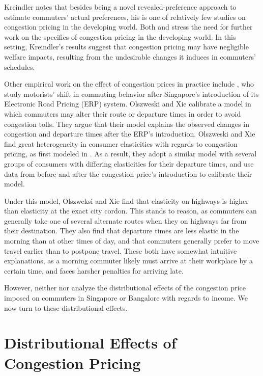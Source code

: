 \documentclass[JEL]{AEA}
\begin{document}
Kreindler notes that besides being a novel revealed-preference approach to estimate commuters' actual preferences, his is one of relatively few studies on congestion pricing in the developing world. Both \cite{kreindler-2018} and \cite{bryan-2020} stress the need for further work on the specifics of congestion pricing in the developing world. In this setting, Kreindler's results suggest that congestion pricing may have negligible welfare impacts, resulting from the undesirable changes it induces in commuters' schedules.

Other empirical work on the effect of congestion prices in practice include \cite{olszweski-2005}, who study motorists' shift in commuting behavior after Singapore's introduction of its Electronic Road Pricing (ERP) system. Olszweski and Xie calibrate a model in which commuters may alter their route or departure times in order to avoid congestion tolls. They argue that their model explains the observed changes in congestion and departure times after the ERP's introduction. Olszweski and Xie find great heterogeneity in consumer elasticities with regards to congestion pricing, as first modeled in \cite{arnott-1994}. As a result, they adopt a similar model with several groups of consumers with differing elasticities for their departure times, and use data from before and after the congestion price's introduction to calibrate their model.

Under this model, Olszweksi and Xie find that elasticity on highways is higher than elasticity at the exact city cordon. This stands to reason, as commuters can generally take one of several alternate routes when they on highways far from their destination. They also find that departure times are less elastic in the morning than at other times of day, and that commuters generally prefer to move travel earlier than to postpone travel. These both have somewhat intuitive explanations, as a morning commuter likely must arrive at their workplace by a certain time, and faces harsher penalties for arriving late.

However, neither \cite{kreindler-2018} nor \cite{olszweski-2005} analyze the distributional effects of the congestion price imposed on commuters in Singapore or Bangalore with regards to income. We now turn to these distributional effects.

\section{Distributional Effects of Congestion Pricing}
\label{distributional-effects}
\end{document}
